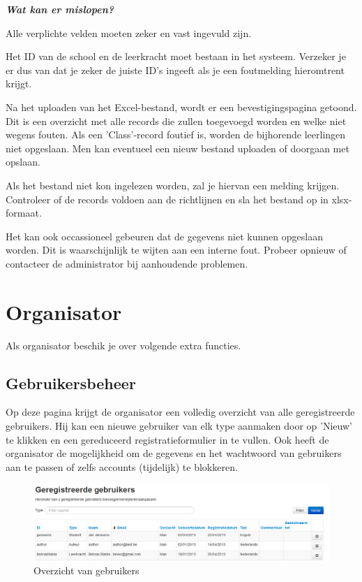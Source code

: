 \documentclass[]{article}
\begin{document}
\textbf{\textit{Wat kan er mislopen?}}

Alle verplichte velden moeten zeker en vast ingevuld zijn.

Het ID van de school en de leerkracht moet bestaan in het systeem. Verzeker je er dus van dat je zeker de juiste ID's ingeeft als je een foutmelding hieromtrent krijgt.

Na het uploaden van het Excel-bestand, wordt er een bevestigingspagina getoond. Dit is een overzicht met alle records die zullen toegevoegd worden en welke niet wegens fouten. Als een 'Class'-record foutief is, worden de bijhorende leerlingen niet opgeslaan. Men kan eventueel een nieuw bestand uploaden of doorgaan met opslaan.

Als het bestand niet kon ingelezen worden, zal je hiervan een melding krijgen. Controleer of de records voldoen aan de richtlijnen en sla het bestand op in xlsx-formaat.

Het kan ook occassioneel gebeuren dat de gegevens niet kunnen opgeslaan worden. Dit is waarschijnlijk te wijten aan een interne fout. Probeer opnieuw of contacteer de administrator bij aanhoudende problemen. 

\section{Organisator}

Als organisator beschik je over volgende extra functies.

\subsection{Gebruikersbeheer}
Op deze pagina krijgt de organisator een volledig overzicht van alle geregistreerde gebruikers. Hij kan een nieuwe gebruiker van elk type aanmaken door op 'Nieuw' te klikken en een gereduceerd registratieformulier in te vullen. Ook heeft de organisator de mogelijkheid om de gegevens en het wachtwoord van gebruikers aan te passen of zelfs accounts (tijdelijk) te blokkeren. 

\begin{figure}[!ht]
	\centering
	\includegraphics[width=1\textwidth]{img/usermgmt}
	\caption{Overzicht van gebruikers}
	\label{usermgmt}
\end{figure}
\end{document}
